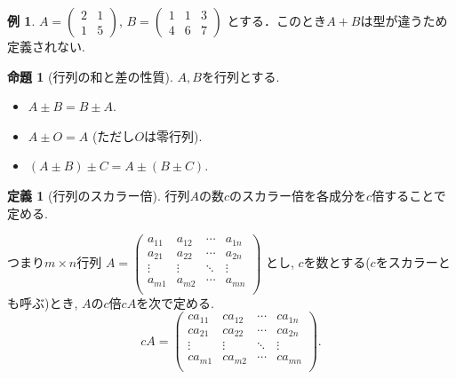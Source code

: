 \documentclass[dvipdfmx,a4paper,11pt]{article}
\theoremstyle{definition}
\newtheorem{prop}[thm]{命題}
\newtheorem{dfn}[thm]{定義}
\newtheorem{exa}[thm]{例}
\begin{document}
 \begin{exa}
 $A = 
 \begin{pmatrix}
 2&1 \\
 1&5
 \end{pmatrix}
 $,
$ 
 B = 
 \begin{pmatrix}
 1&1 &3 \\
 4&6 & 7
 \end{pmatrix}
 $
 とする．このとき$A+B$は型が違うため定義されない. 
 \end{exa}


 \begin{tcolorbox}[
    colback = white,
    colframe = green!35!black,
    fonttitle = \bfseries,
    breakable = true]
    \begin{prop}[行列の和と差の性質]
$A, B$を行列とする.
 \begin{itemize}
 \setlength{\parskip}{0cm}
  	\setlength{\itemsep}{0pt} 
 \item $A\pm B =B\pm A$.
  \item $A\pm O =A$ (ただし$O$は零行列).
  \item $(A \pm B) \pm C =A \pm  (B\pm C)$.
 \end{itemize}
  \end{prop}
 \end{tcolorbox}
 
 
  \begin{tcolorbox}[
    colback = white,
    colframe = green!35!black,
    fonttitle = \bfseries,
    breakable = true]
    \begin{dfn}[行列のスカラー倍]
    \text{}
    行列$A$の数$c$のスカラー倍を各成分を$c$倍することで定める. 
    
    つまり$m \times n$行列
 $
A=\begin{pmatrix}
a_{11}& a_{12} & \cdots &a_{1n} \\
a_{21}& a_{22} & \cdots &a_{2n} \\
\vdots& \vdots	&	\ddots   &	\vdots \\
a_{m1}& a_{m2} & \cdots &a_{mn} \\
\end{pmatrix}$
とし, $c$を数とする($c$をスカラーとも呼ぶ)とき, 
$A$の$c$倍$cA$を次で定める.
$$
cA=
\begin{pmatrix}
ca_{11}&c a_{12} & \cdots &ca_{1n} \\
ca_{21}& ca_{22} & \cdots &ca_{2n} \\
\vdots& \vdots	&	\ddots   &	\vdots \\
ca_{m1}& ca_{m2} & \cdots &ca_{mn} \\
\end{pmatrix}.
$$
  \end{dfn}
 \end{tcolorbox}
\end{document}
